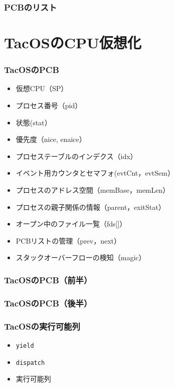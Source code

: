 \documentclass[unicode]{beamer}                   %
\begin{document}
\begin{frame}
  \frametitle{PCBのリスト}
\end{frame}

\section{TacOSのCPU仮想化}
\begin{frame}
  \frametitle{TacOSのPCB}
  \begin{itemize}
    \item 仮想CPU（SP）
    \item プロセス番号（pid）
    \item 状態(stat）
    \item 優先度（nice, enaice）
    \item プロセステーブルのインデクス（idx）
    \item イベント用カウンタとセマフォ(evtCnt，evtSem）
    \item プロセスのアドレス空間（memBase，memLen）
    \item プロセスの親子関係の情報（parent，exitStat）
    \item オープン中のファイル一覧（fds[]）
    \item PCBリストの管理（prev，next）
    \item スタックオーバーフローの検知（magic）
  \end{itemize}
\end{frame}

\begin{frame}
  \frametitle{TacOSのPCB（前半）}
  \vspace{-5mm}
\end{frame}

\begin{frame}
  \frametitle{TacOSのPCB（後半）}
\end{frame}

\begin{frame}
  \frametitle{TacOSの実行可能列}
  \begin{itemize}
    \item {\tt yield}
    \item {\tt dispatch}
    \item 実行可能列
  \end{itemize}
\end{frame}
\end{document}
